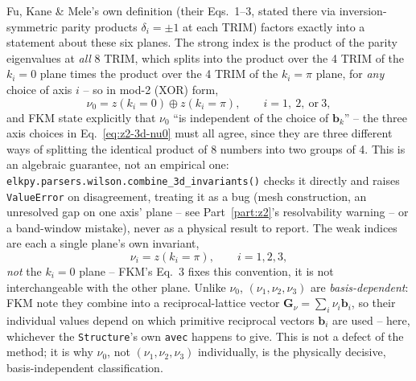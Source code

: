 \documentclass[11pt]{article}
\begin{document}
Fu, Kane \& Mele's own definition \cite{fukanemele2007} (their Eqs.\ 1--3, stated there
via inversion-symmetric parity products $\delta_i=\pm1$ at each TRIM) factors exactly
into a statement about these six planes. The strong index is the product of the parity
eigenvalues at \emph{all} 8 TRIM, which splits into the product over the 4 TRIM of the
$k_i{=}0$ plane times the product over the 4 TRIM of the $k_i{=}\pi$ plane, for
\emph{any} choice of axis $i$ -- so in mod-2 (XOR) form,
\begin{equation}
  \nu_0 = z(k_i{=}0) \oplus z(k_i{=}\pi), \qquad i=1,\ 2,\ \text{or}\ 3,
  \label{eq:z2-3d-nu0}
\end{equation}
and FKM state explicitly that $\nu_0$ ``is independent of the choice of $\mathbf b_k$''
-- the three axis choices in Eq.~\eqref{eq:z2-3d-nu0} must all agree, since they are
three different ways of splitting the identical product of 8 numbers into two groups of
4. This is an algebraic guarantee, not an empirical one:
\texttt{elkpy.parsers.wilson.combine\_3d\_invariants()} checks it directly and raises
\texttt{ValueError} on disagreement, treating it as a bug (mesh construction, an
unresolved gap on one axis' plane -- see Part~\ref{part:z2}'s resolvability warning --
or a band-window mistake), never as a physical result to report. The weak indices are
each a single plane's own invariant,
\begin{equation}
  \nu_i = z(k_i{=}\pi), \qquad i=1,2,3,
  \label{eq:z2-3d-nui}
\end{equation}
\emph{not} the $k_i{=}0$ plane -- FKM's Eq.\ 3 fixes this convention, it is not
interchangeable with the other plane. Unlike $\nu_0$, $(\nu_1,\nu_2,\nu_3)$ are
\emph{basis-dependent}: FKM note they combine into a reciprocal-lattice vector
$\mathbf G_\nu=\sum_i\nu_i\mathbf b_i$, so their individual values depend on which
primitive reciprocal vectors $\mathbf b_i$ are used -- here, whichever the
\texttt{Structure}'s own \texttt{avec} happens to give. This is not a defect of the
method; it is why $\nu_0$, not $(\nu_1,\nu_2,\nu_3)$ individually, is the physically
decisive, basis-independent classification.
\end{document}
